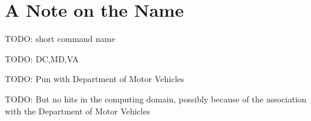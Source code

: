 \section{A Note on the Name}

TODO: short command name

TODO: DC,MD,VA

TODO: Pun with Department of Motor Vehicles

TODO: But no hits in the computing domain, possibly because of the association
with the Department of Motor Vehicles
